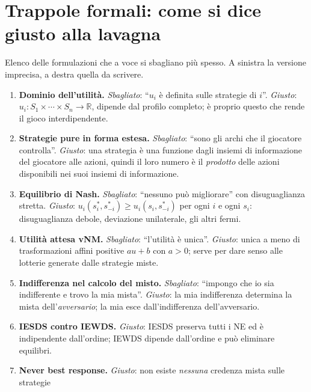 \documentclass[12pt,a4paper,twoside]{book}
\theoremstyle{plain}
\theoremstyle{definition}
\begin{document}
\appendix
\chapter{Trappole formali: come si dice giusto alla lavagna}

Elenco delle formulazioni che a voce si sbagliano più spesso. A sinistra la versione
imprecisa, a destra quella da scrivere.

\begin{enumerate}[leftmargin=*]
  \item \textbf{Dominio dell'utilità.}
        \emph{Sbagliato}: ``$u_i$ è definita sulle strategie di $i$''.
        \emph{Giusto}: $u_i:S_1\times\cdots\times S_n\to\mathbb{R}$, dipende dal
        profilo completo; è proprio questo che rende il gioco interdipendente.
  \item \textbf{Strategie pure in forma estesa.}
        \emph{Sbagliato}: ``sono gli archi che il giocatore controlla''.
        \emph{Giusto}: una strategia è una funzione dagli insiemi di informazione
        del giocatore alle azioni, quindi il loro numero è il \emph{prodotto} delle
        azioni disponibili nei suoi insiemi di informazione.
  \item \textbf{Equilibrio di Nash.}
        \emph{Sbagliato}: ``nessuno può migliorare'' con disuguaglianza stretta.
        \emph{Giusto}: $u_i(s_i^*,s_{-i}^*)\ge u_i(s_i,s_{-i}^*)$ per ogni $i$ e
        ogni $s_i$: disuguaglianza debole, deviazione unilaterale, gli altri fermi.
  \item \textbf{Utilità attesa vNM.}
        \emph{Sbagliato}: ``l'utilità è unica''.
        \emph{Giusto}: unica a meno di trasformazioni affini positive $au+b$ con
        $a>0$; serve per dare senso alle lotterie generate dalle strategie miste.
  \item \textbf{Indifferenza nel calcolo del misto.}
        \emph{Sbagliato}: ``impongo che io sia indifferente e trovo la mia mista''.
        \emph{Giusto}: la mia indifferenza determina la mista dell'\emph{avversario};
        la mia esce dall'indifferenza dell'avversario.
  \item \textbf{IESDS contro IEWDS.}
        \emph{Giusto}: IESDS preserva tutti i NE ed è indipendente dall'ordine;
        IEWDS dipende dall'ordine e può eliminare equilibri.
  \item \textbf{Never best response.}
        \emph{Giusto}: non esiste \emph{nessuna} credenza mista sulle strategie

\end{enumerate}
\end{document}
